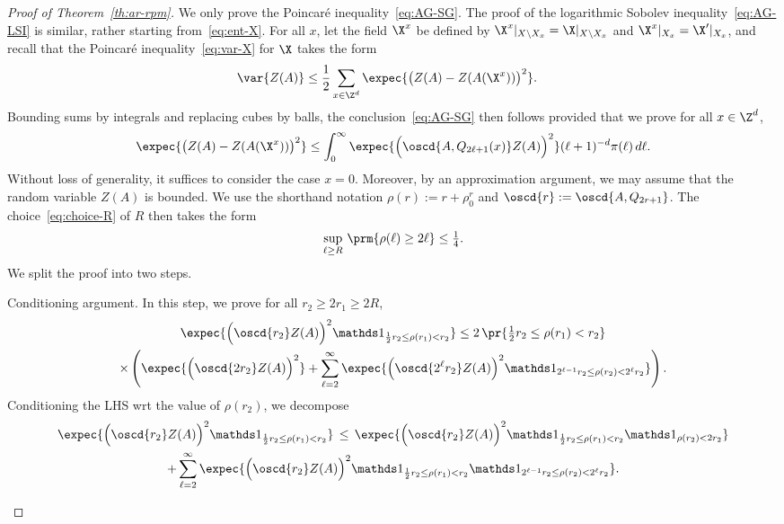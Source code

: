 \begin{proof}[Proof of Theorem~\ref{th:ar-rpm}]
We only prove the Poincaré inequality~\eqref{eq:AG-SG}. The proof of the logarithmic Sobolev inequality~\eqref{eq:AG-LSI} is similar, rather starting from~\eqref{eq:ent-X}. For all $x$, let the field $\X^x$ be defined by $\X^x|_{X\setminus X_{x}}=\X|_{X\setminus X_{x}}$ and $\X^x|_{X_{x}}=\X'|_{X_{x}}$, and recall that the Poincaré inequality~\eqref{eq:var-X} for $\X$ takes the form
\begin{align*}
\var{Z(A)}&\le\frac12\sum_{x\in\Z^d}\expec{\big(Z(A)-Z(A(\X^x))\big)^2}.
\end{align*}
Bounding sums by integrals and replacing cubes by balls, the conclusion~\eqref{eq:AG-SG} then follows provided that we prove for all $x\in\Z^d$,
\begin{align}\label{eq:AG-centered}
\expec{\big(Z(A)-Z(A(\X^x))\big)^2}\le\int_0^\infty \expec{\Big(\oscd{A,Q_{2\ell+1}(x)}Z(A)\Big)^2}(\ell+1)^{-d}\pi(\ell)\,d\ell.
\end{align}
Without loss of generality, it suffices to consider the case $x=0$. Moreover, by an approximation argument, we may assume that the random variable $Z(A)$ is bounded. We use the shorthand notation $\rho(r):=r+\rho_0^r$ and $\oscd{r}:=\oscd{A,Q_{2r+1}}$. The choice~\eqref{eq:choice-R} of $R$ then takes the form
\begin{align}\label{eq:choice-R2}
\sup_{\ell\ge R}\,\prm{\rho(\ell)\ge2\ell}\le\tfrac14.
\end{align}
We split the proof into two steps.

\medskip

\setcounter{stepcount}{0}
\begin{step}{Conditioning argument.}\label{step1prooftheo2.8}
In this step, we prove for all $r_2\ge 2r_1\ge2R$,
\begin{multline}\label{eq:AG-intermed}
\expec{\Big(\oscd{r_2}Z(A)\Big)^2\mathds1_{\frac12r_2\le\rho(r_1)<r_2}}\le2\,\pr{\tfrac12 r_2\le\rho(r_1)<r_2}\\
\times\left(\expec{\Big(\oscd{2r_2}Z(A)\Big)^2}+\sum_{\ell=2}^\infty\expec{\Big(\oscd{2^\ell r_2}Z(A)\Big)^2\mathds1_{2^{\ell-1}r_2\le \rho(r_2)<2^{\ell}r_2}}\right).
\end{multline}
Conditioning the LHS wrt the value of $\rho(r_2)$, we decompose
\begin{multline}\label{eq:decomp-AG-2}
\expec{\Big(\oscd{r_2}Z(A)\Big)^2\mathds1_{\frac12r_2\le\rho(r_1)<r_2}}\,\le\,\expec{\Big(\oscd{r_2}Z(A)\Big)^2\mathds1_{\frac12r_2\le\rho(r_1)<r_2}\mathds1_{\rho(r_2)<2r_2}}\\
+\sum_{\ell=2}^\infty\expec{\Big(\oscd{r_2}Z(A)\Big)^2\mathds1_{\frac12r_2\le\rho(r_1)<r_2}\mathds1_{2^{\ell-1}r_2\le\rho(r_2)<2^{\ell}r_2}}.
\end{multline}
\pagebreak


\end{step}
\end{proof}
